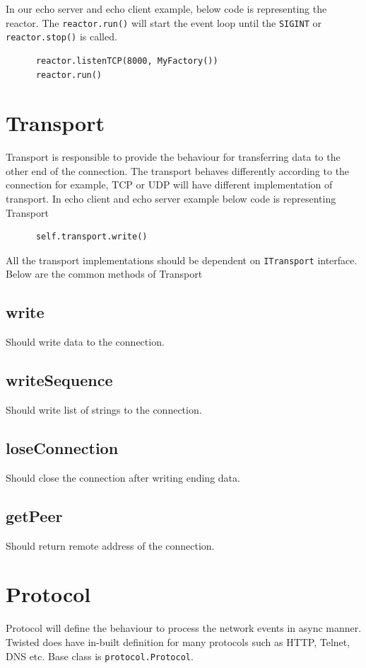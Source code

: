 \documentclass{article}
\begin{document}
    In our echo server and echo client example, below code is representing the
    reactor. The \texttt{reactor.run()} will start the event loop until the
    \texttt{SIGINT} or \texttt{reactor.stop()} is called.

    \begin{verbatim}
      reactor.listenTCP(8000, MyFactory())
      reactor.run()
    \end{verbatim}

  \section{Transport}

    Transport is responsible to provide the behaviour for transferring data to
    the other end of the connection. The transport behaves differently
    according to the connection for example, TCP or UDP will have different
    implementation of transport. 
    In echo client and echo server example below code is representing Transport

    \begin{verbatim}
      self.transport.write()
    \end{verbatim}

    All the transport implementations should be dependent on
    \texttt{ITransport} interface. Below are the common methods of Transport

    \subsection{write} Should write data to the connection.

    \subsection {writeSequence} Should write list of strings to the connection.

    \subsection{loseConnection} Should close the connection after writing
    ending data.

    \subsection{getPeer} Should return remote address of the connection.

  \section{Protocol}
    Protocol will define the behaviour to process the network events in async
    manner. Twisted does have in-built definition for many protocols such as
    HTTP, Telnet, DNS etc. Base class is \texttt{protocol.Protocol}.
\end{document}
